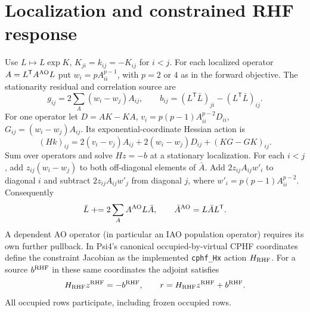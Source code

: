 \documentclass[11pt]{article}
\newcommand{\T}{^{\mathsf T}}
\begin{document}
\section{Localization and constrained RHF response}
Use $L\mapsto L\exp K$, $K_{ji}=k_{ij}=-K_{ij}$ for $i<j$.
For each localized operator $A=L\T A^{\rm AO}L$ put
$w_i=p A_{ii}^{p-1}$, with $p=2$ or $4$ as in the forward objective.
The stationarity residual and correlation source are
\begin{equation}
 g_{ij}=2\sum_A(w_i-w_j)A_{ij},\qquad
 b_{ij}=(L\T\bar L)_{ji}-(L\T\bar L)_{ij}.
\end{equation}
For one operator let $D=AK-KA$, $v_i=p(p-1)A_{ii}^{p-2}D_{ii}$,
$G_{ij}=(w_i-w_j)A_{ij}$. Its exponential-coordinate Hessian action is
\begin{equation}
 (Hk)_{ij}=2(v_i-v_j)A_{ij}+2(w_i-w_j)D_{ij}+(KG-GK)_{ij}.
\end{equation}
Sum over operators and solve $Hz=-b$ at a stationary localization.
For each $i<j$, add $z_{ij}(w_i-w_j)$ to both off-diagonal elements of
$\bar A$. Add $2z_{ij}A_{ij}w'_i$ to diagonal $i$ and subtract
$2z_{ij}A_{ij}w'_j$ from diagonal $j$, where $w'_i=p(p-1)A_{ii}^{p-2}$.
Consequently
\begin{equation}
 \bar L\mathrel{+}=2\sum_A A^{\rm AO}L\bar A,\qquad
 \bar A^{\rm AO}=L\bar A L\T .
\end{equation}
A dependent AO operator (in particular an IAO population operator) requires
its own further pullback. In Psi4's canonical occupied-by-virtual CPHF
coordinates define the constraint Jacobian as the implemented
\texttt{cphf\_Hx} action $H_{\rm RHF}$. For a source $b^{\rm RHF}$
in these same coordinates the adjoint satisfies
\begin{equation}
 H_{\rm RHF}z^{\rm RHF}=-b^{\rm RHF},\qquad
 r=H_{\rm RHF}z^{\rm RHF}+b^{\rm RHF}.
\end{equation}
All occupied rows participate, including frozen occupied rows.
\end{document}
